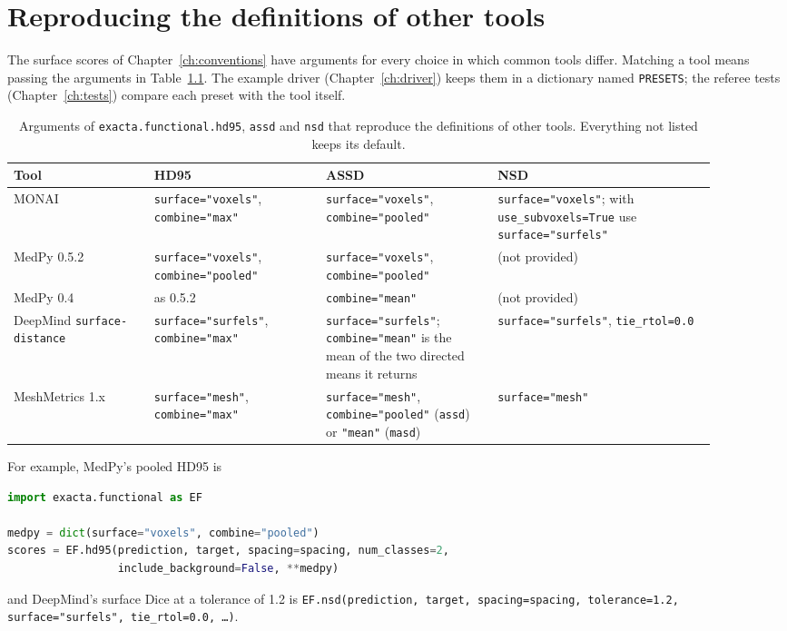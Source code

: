\chapter{Reproducing the definitions of other tools}\label{ch:tools}

The surface scores of Chapter~\ref{ch:conventions} have arguments for every choice in which
common tools differ. Matching a tool means passing the arguments in
Table~\ref{tab:presets}. The example driver (Chapter~\ref{ch:driver}) keeps them in a
dictionary named \texttt{PRESETS}; the referee tests (Chapter~\ref{ch:tests}) compare each
preset with the tool itself.

\begin{table}[ht]
\centering
\footnotesize
\begin{tabular}{@{}>{\raggedright\arraybackslash}p{0.18\linewidth}%
  >{\raggedright\arraybackslash}p{0.22\linewidth}%
  >{\raggedright\arraybackslash}p{0.22\linewidth}%
  >{\raggedright\arraybackslash}p{0.28\linewidth}@{}}
\toprule
Tool & HD95 & ASSD & NSD \\
\midrule
MONAI &
\texttt{surface="voxels"}, \texttt{combine="max"} &
\texttt{surface="voxels"}, \texttt{combine="pooled"} &
\texttt{surface="voxels"}; with \texttt{use\_subvoxels=True} use \texttt{surface="surfels"} \\
MedPy 0.5.2 &
\texttt{surface="voxels"}, \texttt{combine="pooled"} &
\texttt{surface="voxels"}, \texttt{combine="pooled"} &
(not provided) \\
MedPy 0.4 &
as 0.5.2 &
\texttt{combine="mean"} &
(not provided) \\
DeepMind \texttt{surface-distance} &
\texttt{surface="surfels"}, \texttt{combine="max"} &
\texttt{surface="surfels"}; \texttt{combine="mean"} is the mean of the two directed means it returns &
\texttt{surface="surfels"}, \texttt{tie\_rtol=0.0} \\
MeshMetrics 1.x &
\texttt{surface="mesh"}, \texttt{combine="max"} &
\texttt{surface="mesh"}, \texttt{combine="pooled"} (\texttt{assd}) or \texttt{"mean"} (\texttt{masd}) &
\texttt{surface="mesh"} \\
\bottomrule
\end{tabular}
\caption{Arguments of \texttt{exacta.functional.hd95}, \texttt{assd} and \texttt{nsd} that
reproduce the definitions of other tools. Everything not listed keeps its default.}
\label{tab:presets}
\end{table}

For example, MedPy's pooled HD95 is
\begin{lstlisting}[language=Python]
import exacta.functional as EF

medpy = dict(surface="voxels", combine="pooled")
scores = EF.hd95(prediction, target, spacing=spacing, num_classes=2,
                 include_background=False, **medpy)
\end{lstlisting}
and DeepMind's surface Dice at a tolerance of 1.2 is
\texttt{EF.nsd(prediction, target, spacing=spacing, tolerance=1.2, surface="surfels", tie\_rtol=0.0, \ldots)}.


